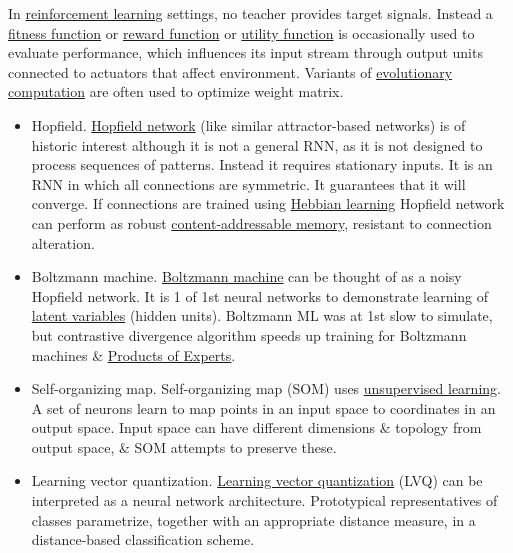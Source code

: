 \documentclass{article}
\begin{document}
\begin{itemize}
	In \href{https://en.wikipedia.org/wiki/Reinforcement_learning}{reinforcement learning} settings, no teacher provides target signals. Instead a \href{https://en.wikipedia.org/wiki/Fitness_function}{fitness function} or \href{https://en.wikipedia.org/wiki/Reward_function}{reward function} or \href{https://en.wikipedia.org/wiki/Utility_function}{utility function} is occasionally used to evaluate performance, which influences its input stream through output units connected to actuators that affect environment. Variants of \href{https://en.wikipedia.org/wiki/Evolutionary_computation}{evolutionary computation} are often used to optimize weight matrix.
	\begin{itemize}
		\item {\sf Hopfield.} \href{https://en.wikipedia.org/wiki/Hopfield_network}{Hopfield network} (like similar attractor-based networks) is of historic interest although it is not a general RNN, as it is not designed to process sequences of patterns. Instead it requires stationary inputs. It is an RNN in which all connections are symmetric. It guarantees that it will converge. If connections are trained using \href{https://en.wikipedia.org/wiki/Hebbian_learning}{Hebbian learning} Hopfield network can perform as robust \href{https://en.wikipedia.org/wiki/Content-addressable_memory}{content-addressable memory}, resistant to connection alteration.
		\item {\sf Boltzmann machine.} \href{https://en.wikipedia.org/wiki/Boltzmann_machine}{Boltzmann machine} can be thought of as a noisy Hopfield network. It is 1 of 1st neural networks to demonstrate learning of \href{https://en.wikipedia.org/wiki/Latent_variable}{latent variables} (hidden units). Boltzmann ML was at 1st slow to simulate, but contrastive divergence algorithm speeds up training for Boltzmann machines \& \href{https://en.wikipedia.org/wiki/Product_of_Experts}{Products of Experts}.
		\item {\sf Self-organizing map.} Self-organizing map (SOM) uses \href{https://en.wikipedia.org/wiki/Unsupervised_learning}{unsupervised learning}. A set of neurons learn to map points in an input space to coordinates in an output space. Input space can have different dimensions \& topology from output space, \& SOM attempts to preserve these.
		\item {\sf Learning vector quantization.} \href{https://en.wikipedia.org/wiki/Learning_vector_quantization}{Learning vector quantization} (LVQ) can be interpreted as a neural network architecture. Prototypical representatives of classes parametrize, together with an appropriate distance measure, in a distance-based classification scheme.

\end{itemize}
\end{itemize}
\end{document}
